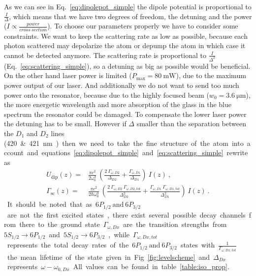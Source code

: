 As we can see in Eq.~\eqref{eq:dipolepot_simple} the dipole potential is proportional 
to \(\frac{I}{\Delta} \), which means that we have two degrees of freedom, the 
detuning and the power (\(I\propto\frac{power}{cross~section} \)). To choose our 
parameters properly we have to consider some constraints. We want to keep the 
scattering rate as low as possible, because each photon scattered may depolarize 
the atom or depump the atom in which case it cannot be detected
anymore. The scattering rate is proportional 
to \(\frac{I}{\Delta^2} \) (Eq.~\ref{eq:scattering_simple}), so a detuning as big 
as possible would be beneficial. On the other hand laser power is limited 
(\(P_{\max}=\SI{80}{\milli\watt} \)), due to the maximum power output of our laser.
And additionally we do not want to send too much power onto the resonator, because 
due to the highly focused beam (\(w_0 = \SI{3.6}{\micro\meter} \)), the more
energetic wavelength and more absorption of the glass in the blue spectrum the 
resonator could be damaged. To compensate the lower laser power the detuning has 
to be small. However if \(\Delta \) smaller than the separation between the 
\(D_1 \) and \(D_2 \) lines (\SI{420}~\& \SI{421}{\nano\meter}) then we need to 
take the fine structure of the atom into account and equations~\eqref{eq:dipolepot_simple} 
and~\eqref{eq:scattering_simple} rewrite as~\cite{grimm} 
%
\begin{align}\label{eq:dipolpotenial}
    U_\mathrm{dip}(z) =& \frac{\pi c^2}{2\omega_0^3}~\left( 
        \frac{2~\Gamma_{\omega,D2}}{\Delta_{D2}} + 
        \frac{\Gamma_{\omega,D1}}{\Delta_{D1}} \right)~I(z)~, \\
    \Gamma_{\mathrm{sc}}(z) =& \frac{\pi c^2}{2\hbar\omega_0^3}~\left( 
        \frac{2~\Gamma_{\omega,D2}~\Gamma_{\omega,D2,tot} }{\Delta_{D2}^2 } + 
        \frac{\Gamma_{\omega,D1}~\Gamma_{\omega,D1,tot} }{\Delta_{D1}^2 } \right)~I(z)~.
\end{align}
%

It should be noted that as \(6P_{1/2}~\text{and}~6P_{3/2} \) are not the first
excited states, there exist several possible decay channels from there to the
ground state. \(\Gamma_{\omega,Dx} \) are the transition strengths from 
\(5S_{1/2} \rightarrow 6P_{1/2} \) and \(5S_{1/2} \rightarrow 6P_{3/2} \), while
\(\Gamma_{\omega,Dx,tot} \) represents the total decay rates of the 
\(6P_{1/2}~\text{and}~6P_{3/2} \) states with \(\frac{1}{\Gamma_{\omega,Dx,tot}} \) 
the mean lifetime of the state given in Fig.~\ref{fig:levelscheme} and \(\Delta_{Dx} \) 
represents \(\omega - \omega_{0,Dx} \). All values can be found in 
table~\ref{table:iso_prop}.

